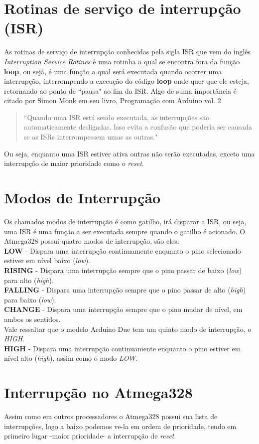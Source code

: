 \documentclass[a4paper,12pt,portuguese]{ufms-cpcx}
\begin{document}
\section{Rotinas de serviço de interrupção (ISR)}\label{isr}
As rotinas de serviço de interrupção conhecidas pela sigla ISR que vem do inglês \textit{Interruption Service Rotines} é uma rotinha a qual se encontra fora da função \textbf{loop}, ou sejá, é uma função a qual será executada quando ocorrer uma interrupção, interrompendo a execução do código \textbf{loop} onde quer que ele esteja, retornando ao ponto de ``pausa" ao fim da ISR. Algo de suma importância é citado por Simon Monk em seu livro, Programação com Arduino vol. 2 \begin{quote}``Quando uma ISR está sendo executada, as interrupções são automaticamente desligadas. Isso evita a confusão que poderia ser causada se as ISRs interrompessem umas as outras."\end{quote}
Ou seja, enquanto uma ISR estiver ativa outras não serão executadas, exceto uma interrupção de maior prioridade como o \textit{reset}.

\section{Modos de Interrupção}\label{modointerrupcao}
Os chamados modos de interrupção é como gatilho, irá disparar a ISR, ou seja, uma ISR é uma função a ser executada sempre quando o gatilho é acionado. O Atmega328 possui quatro modos de interrupção, são eles: \\
\textbf{LOW} - Dispara uma interrupção continuamente enquanto o pino selecionado estiver em nível baixo (\textit{low}).\\
\textbf{RISING} - Dispara uma interrupção sempre que o pino passar de baixo (\textit{low}) para alto (\textit{high}).\\
\textbf{FALLING} - Dispara uma interrupção sempre que o pino passar de alto (\textit{high}) para baixo (\textit{low}).\\
\textbf{CHANGE} - Dispara uma interrupção sempre que o pino mudar de nível, em ambos os sentidos.\\
Vale ressaltar que o modelo Arduino Due tem um quinto modo de interrupção, o \textit{HIGH}.\\
\textbf{HIGH} - Dispara uma interrupção continuamente enquanto o pino estiver em nível alto (\textit{high}), assim como o modo \textit{LOW}.

\section{Interrupção no Atmega328}\label{interrupcao328}
Assim como em outros processadores o Atmega328 possui sua lista de interrupções, logo a baixo podemos ve-la em ordem de prioridade, tendo em primeiro lugar -maior prioridade- a interrupção de \textit{reset}.
\end{document}
